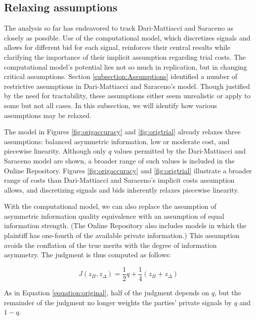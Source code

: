 \documentclass{article}
\begin{document}
\subsection{Relaxing assumptions}

The analysis so far has endeavored to track Dari-Mattiacci and Saraceno as closely as possible. Use of the computational model, which discretizes signals and allows for  different bid for each signal, reinforces their central results while clarifying the importance of their implicit assumption regarding trial costs. The computational model's potential lies not so much in replication, but in changing critical assumptions. Section \ref{subsection:Assumptions} identified a number of restrictive assumptions in Dari-Mattiacci and Saraceno's model. Though justified by the need for tractability, these assumptions either seem unrealistic or apply to some but not all cases. In this subsection, we will identify how various assumptions may be relaxed.

The model in Figures \ref{fig:origaccuracy} and \ref{fig:origtrial} already relaxes three assumptions: balanced asymmetric information, low or moderate cost, and piecewise linearity. Although only $q$ values permitted by the Dari-Mattiacci and Saraceno model are shown, a broader range of such values is included in the Online Repository. Figures \ref{fig:origaccuracy} and \ref{fig:origtrial} illustrate a broader range of costs than Dari-Mattiacci and Saraceno's implicit costs assumption allows, and discretizing signals and bids inherently relaxes piecewise linearity.

With the computational model, we can also replace the assumption of asymmetric information quality equivalence with an assumption of equal information strength. (The Online Repository also includes models in which the plaintiff has one-fourth of the available private information.) This assumption avoids the conflation of the true merits with the degree of information asymmetry. The judgment is thus computed as follows:

\begin{equation} \label{equation:equalInfo}
J(z_\Pi, z_\Delta) = \frac{1}{2}q + \frac{1}{4} (z_\Pi+z_\Delta)
\end{equation}

\noindent As in Equation \ref{equation:original}, half of the judgment depends on $q$, but the remainder of the judgment no longer weights the parties' private signals by $q$ and $1-q$.
\end{document}
